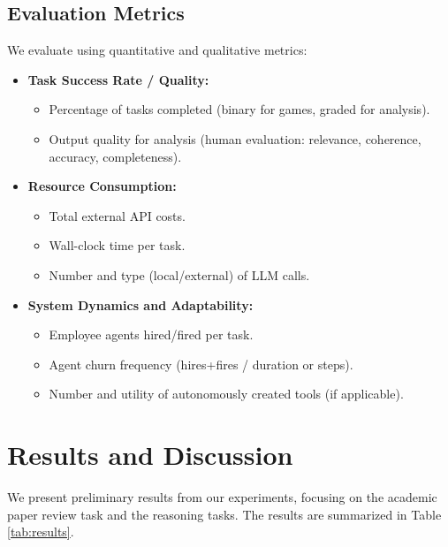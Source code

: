 \documentclass[conference]{IEEEtran}
\begin{document}
\subsection{Evaluation Metrics}
\label{subsec:metrics}
We evaluate using quantitative and qualitative metrics:
\begin{itemize}
    \item \textbf{Task Success Rate / Quality:}
        \begin{itemize}
            \item Percentage of tasks completed (binary for games, graded for analysis).
            \item Output quality for analysis (human evaluation: relevance, coherence, accuracy, completeness).
        \end{itemize}
    \item \textbf{Resource Consumption:}
        \begin{itemize}
            \item Total external API costs.
            \item Wall-clock time per task.
            \item Number and type (local/external) of LLM calls.
        \end{itemize}
    \item \textbf{System Dynamics and Adaptability:}
        \begin{itemize}
            \item Employee agents hired/fired per task.
            \item Agent churn frequency (hires+fires / duration or steps).
            \item Number and utility of autonomously created tools (if applicable).
        \end{itemize}
\end{itemize}

\section{Results and Discussion}
\label{sec:results}
We present preliminary results from our experiments, focusing on the academic paper review task and the reasoning tasks. The results are summarized in Table \ref{tab:results}.
\end{document}
